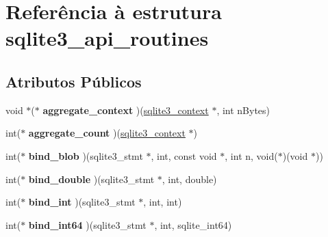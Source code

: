 \hypertarget{structsqlite3__api__routines}{\section{Referência à estrutura sqlite3\-\_\-api\-\_\-routines}
\label{structsqlite3__api__routines}
}
\subsection*{Atributos Públicos}
\begin{DoxyCompactItemize}
\item 
\hypertarget{structsqlite3__api__routines_a4af9ccf21e07862a8c3636c16d3acd19}{void $\ast$($\ast$ {\bfseries aggregate\-\_\-context} )(\hyperlink{structsqlite3__context}{sqlite3\-\_\-context} $\ast$, int n\-Bytes)}\label{structsqlite3__api__routines_a4af9ccf21e07862a8c3636c16d3acd19}

\item 
\hypertarget{structsqlite3__api__routines_a8373f7a5dd2d6f1c86bbf024b1796156}{int($\ast$ {\bfseries aggregate\-\_\-count} )(\hyperlink{structsqlite3__context}{sqlite3\-\_\-context} $\ast$)}\label{structsqlite3__api__routines_a8373f7a5dd2d6f1c86bbf024b1796156}

\item 
\hypertarget{structsqlite3__api__routines_afeb41d70ab5a221fec488560934c825b}{int($\ast$ {\bfseries bind\-\_\-blob} )(sqlite3\-\_\-stmt $\ast$, int, const void $\ast$, int n, void($\ast$)(void $\ast$))}\label{structsqlite3__api__routines_afeb41d70ab5a221fec488560934c825b}

\item 
\hypertarget{structsqlite3__api__routines_aca43a229ce28397ba8c18a4d6e03e40c}{int($\ast$ {\bfseries bind\-\_\-double} )(sqlite3\-\_\-stmt $\ast$, int, double)}\label{structsqlite3__api__routines_aca43a229ce28397ba8c18a4d6e03e40c}

\item 
\hypertarget{structsqlite3__api__routines_a6fef49e6c9c1fa573c55cc6668a8448f}{int($\ast$ {\bfseries bind\-\_\-int} )(sqlite3\-\_\-stmt $\ast$, int, int)}\label{structsqlite3__api__routines_a6fef49e6c9c1fa573c55cc6668a8448f}

\item 
\hypertarget{structsqlite3__api__routines_a489304cada65abca390da9b751da8800}{int($\ast$ {\bfseries bind\-\_\-int64} )(sqlite3\-\_\-stmt $\ast$, int, sqlite\-\_\-int64)}\label{structsqlite3__api__routines_a489304cada65abca390da9b751da8800}


\end{DoxyCompactItemize}
